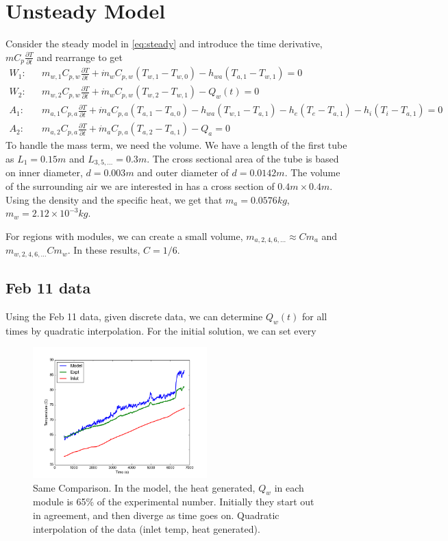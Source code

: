 \documentclass[11pt]{article}
\begin{document}
\section{Unsteady Model}
Consider the steady model in \ref{eq:steady} and introduce the time derivative, $mC_{p}\frac{\partial T}{\partial t}$ and rearrange to get 
\begin{eqnarray} 
W_1: & & m_{w,1}C_{p,w}\frac{\partial T}{\partial t} + \dot{m}_wC_{p,w}(T_{w,1}-T_{w,0}) - h_{wa}(T_{a,1}-T_{w,1}) = 0 \\
W_2: & & m_{w,2}C_{p,w}\frac{\partial T}{\partial t} + \dot{m}_wC_{p,w}(T_{w,2}-T_{w,1}) - Q_w(t) = 0\\
A_1: & & m_{a,1}C_{p,a}\frac{\partial T}{\partial t} + \dot{m}_aC_{p,a}(T_{a,1}-T_{a,0}) - h_{wa}(T_{w,1}-T_{a,1}) - h_{e}(T_e-T_{a,1}) - h_{i}(T_i-T_{a,1})= 0 \\
A_2: & & m_{a,2}C_{p,a}\frac{\partial T}{\partial t} +\dot{m}_aC_{p,a}(T_{a,2}-T_{a,1}) - Q_a = 0 
\end{eqnarray}
To handle the mass term, we need the volume. We have a length of the first tube as $L_1 = 0.15m$ and $L_{3,5,\ldots} = 0.3m$. The cross sectional area of the tube is based on inner diameter, $d = 0.003m$ and outer diameter of $d = 0.0142m$. The volume of the surrounding air we are interested in has a cross section of $0.4m \times 0.4m$. Using the density and the specific heat, we get that $m_a = 0.0576 kg$, $m_w = 2.12\times 10^{-3} kg$.

For regions with modules, we can create a small volume, $m_{a,2,4,6,\ldots} \approx Cm_a$ and $m_{w,2,4,6,\ldots} Cm_w$. In these results, $C = 1/6$.

\subsection{Feb 11 data}
Using the Feb 11 data, given discrete data, we can determine $Q_w(t)$ for all times by quadratic interpolation. For the initial solution, we can set every 

\begin{figure}[!ht]
\centering
\includegraphics[width=0.6\textwidth]{Feb11_unst_10.png}
\caption{Same Comparison. In the model, the heat generated, $Q_w$ in each module is 65\% of the experimental number. Initially they start out in agreement, and then diverge as time goes on. Quadratic interpolation of the data (inlet temp, heat generated).}
\end{figure}
\end{document}
